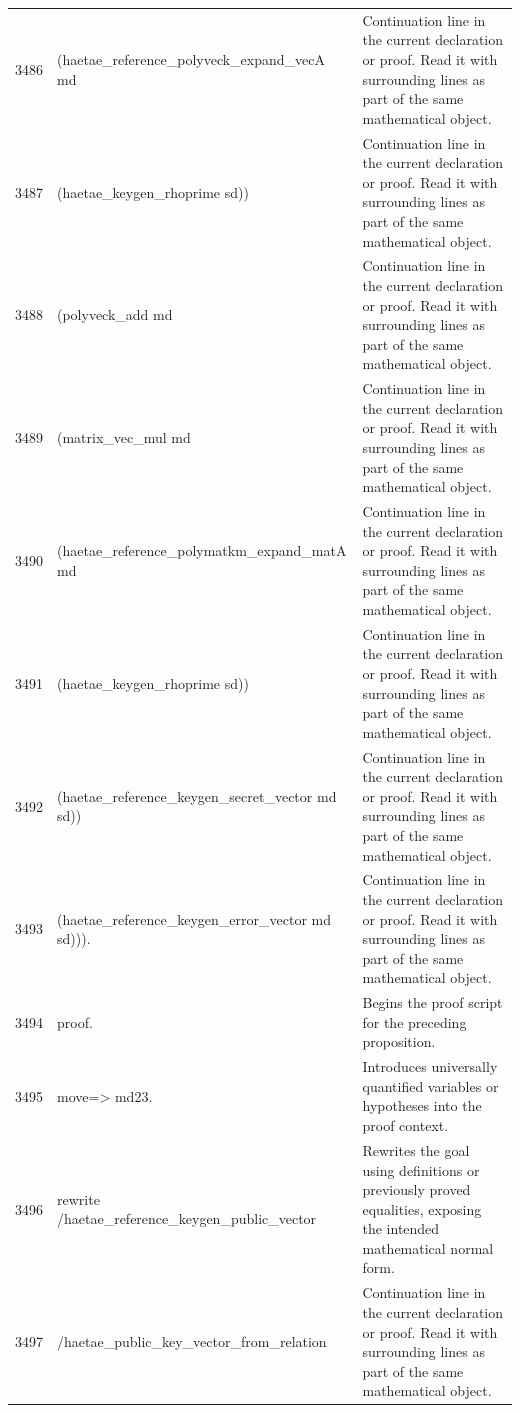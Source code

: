 \documentclass[10pt]{article}
\begin{document}
\begin{longtable}{r L{0.53\textwidth} L{0.37\textwidth}}
3486 & {\ttfamily\scriptsize       (haetae\_reference\_polyveck\_expand\_vecA md} & Continuation line in the current declaration or proof.  Read it with surrounding lines as part of the same mathematical object. \\
3487 & {\ttfamily\scriptsize         (haetae\_keygen\_rhoprime sd))} & Continuation line in the current declaration or proof.  Read it with surrounding lines as part of the same mathematical object. \\
3488 & {\ttfamily\scriptsize       (polyveck\_add md} & Continuation line in the current declaration or proof.  Read it with surrounding lines as part of the same mathematical object. \\
3489 & {\ttfamily\scriptsize         (matrix\_vec\_mul md} & Continuation line in the current declaration or proof.  Read it with surrounding lines as part of the same mathematical object. \\
3490 & {\ttfamily\scriptsize           (haetae\_reference\_polymatkm\_expand\_matA md} & Continuation line in the current declaration or proof.  Read it with surrounding lines as part of the same mathematical object. \\
3491 & {\ttfamily\scriptsize             (haetae\_keygen\_rhoprime sd))} & Continuation line in the current declaration or proof.  Read it with surrounding lines as part of the same mathematical object. \\
3492 & {\ttfamily\scriptsize           (haetae\_reference\_keygen\_secret\_vector md sd))} & Continuation line in the current declaration or proof.  Read it with surrounding lines as part of the same mathematical object. \\
3493 & {\ttfamily\scriptsize         (haetae\_reference\_keygen\_error\_vector md sd))).} & Continuation line in the current declaration or proof.  Read it with surrounding lines as part of the same mathematical object. \\
3494 & {\ttfamily\scriptsize proof.} & Begins the proof script for the preceding proposition. \\
3495 & {\ttfamily\scriptsize move=> md23.} & Introduces universally quantified variables or hypotheses into the proof context. \\
3496 & {\ttfamily\scriptsize rewrite /haetae\_reference\_keygen\_public\_vector} & Rewrites the goal using definitions or previously proved equalities, exposing the intended mathematical normal form. \\
3497 & {\ttfamily\scriptsize         /haetae\_public\_key\_vector\_from\_relation} & Continuation line in the current declaration or proof.  Read it with surrounding lines as part of the same mathematical object. \\

\end{longtable}
\end{document}
